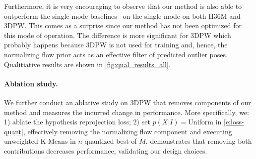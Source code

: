 Furthermore, it is very encouraging to observe that our method is also able to outperform the single-mode baselines~\cite{kanazawa18end-to-end,kolotouros19convolutional,kolotouros19learning} on the single mode \MPJPE on both H36M and 3DPW. 
This comes as a surprise since our method has not been optimized for this mode of operation.
The difference is more significant for 3DPW which probably happens because 3DPW is not used for training and, hence, the normalizing flow prior acts as an effective filter of predicted outlier poses. Qualitiative results are shown in \cref{fig:qual_results_all}.

\paragraph{Ablation study.}
We further conduct an ablative study on 3DPW that removes components of our method and measures the incurred change in performance. More specifically, we: 1) ablate the hypothesis reprojection loss; 2) set $p(X|I)=\text{Uniform}$ in \cref{e:loss-quant}, effectively removing the normalizing flow component and executing unweighted K-Means in $n$-quantized-best-of-$M$.  demonstrates that removing both contributions decreases performance, validating our design choices.

% 

% 

% 






